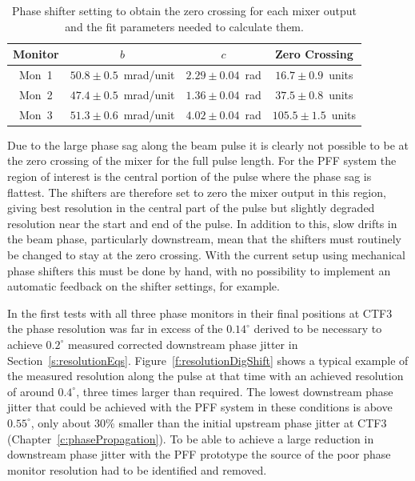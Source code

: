 \begin{table}
  \begin{center}
    \begin{tabular}{|c c c c|}
	   \hline
       Monitor & \(b\) & \(c\) & Zero Crossing \\ \hline
       Mon~1 & \(50.8\pm0.5\)~mrad/unit & \(2.29\pm0.04\)~rad & \(16.7\pm0.9\)~units \\ 
       Mon~2 & \(47.4\pm0.5\)~mrad/unit & \(1.36\pm0.04\)~rad & \(37.5\pm0.8\)~units \\
       Mon~3 & \(51.3\pm0.6\)~mrad/unit & \(4.02\pm0.04\)~rad & \(105.5\pm1.5\)~units \\ \hline
    \end{tabular}
    \caption{Phase shifter setting to obtain the zero crossing for each mixer output and the fit parameters needed to calculate them.}
  	\label{t:calZeroCross}
  \end{center}
\end{table}

Due to the large phase sag along the beam pulse it is clearly not possible to be at the zero crossing of the mixer for the full pulse length. For the PFF system the region of interest is the central portion of the pulse where the phase sag is flattest. The shifters are therefore set to zero the mixer output in this region, giving best resolution in the central part of the pulse but slightly degraded resolution near the start and end of the pulse. In addition to this, slow drifts in the beam phase, particularly downstream, mean that the shifters must routinely be changed to stay at the zero crossing. With the current setup using mechanical phase shifters this must be done by hand, with no possibility to implement an automatic feedback on the shifter settings, for example.


In the first tests with all three phase monitors in their final positions at CTF3 the phase resolution was far in excess of the \(0.14^\circ\) derived to be necessary to achieve \(0.2^\circ\) measured corrected downstream phase jitter in Section~\ref{s:resolutionEqs}. Figure~\ref{f:resolutionDigShift} shows a typical example of the measured resolution along the pulse at that time with an achieved resolution of around \(0.4^\circ\), three times larger than required. The lowest downstream phase jitter that could be achieved with the PFF system in these conditions is above \(0.55^\circ\), only about 30\% smaller than the initial upstream phase jitter at CTF3 (Chapter~\ref{c:phasePropagation}). To be able to achieve a large reduction in downstream phase jitter with the PFF prototype the source of the poor phase monitor resolution had to be identified and removed.

